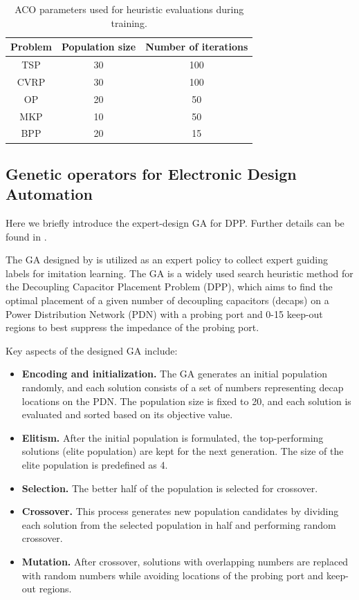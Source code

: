 \begin{table}[]
    \small
    \centering
    \caption{ACO parameters used for heuristic evaluations during training.}
    \begin{tabular}{c|cc}
    \toprule
        Problem &  Population size &  Number of iterations \\
        \midrule
         TSP &   30   &  100   \\
         CVRP &  30    &  100    \\
         OP &    20  &   50  \\
         MKP &   10   &  50   \\
         BPP &    20  &   15  \\
         \bottomrule
    \end{tabular}
    \label{tab: aco parameters}
\end{table}

\subsection{Genetic operators for Electronic Design Automation}

Here we briefly introduce the expert-design GA for DPP. Further details can be found in \cite[Appendix B]{kim2023devformer}.

The GA designed by \citet{kim2023devformer} is utilized as an expert policy to collect expert guiding labels for imitation learning. The GA is a widely used search heuristic method for the Decoupling Capacitor Placement Problem (DPP), which aims to find the optimal placement of a given number of decoupling capacitors (decaps) on a Power Distribution Network (PDN) with a probing port and 0-15 keep-out regions to best suppress the impedance of the probing port.

Key aspects of the designed GA include:
\begin{itemize}
    \item \textbf{Encoding and initialization.} The GA generates an initial population randomly, and each solution consists of a set of numbers representing decap locations on the PDN. The population size is fixed to 20, and each solution is evaluated and sorted based on its objective value.
    \item \textbf{Elitism.} After the initial population is formulated, the top-performing solutions (elite population) are kept for the next generation. The size of the elite population is predefined as 4.
    \item \textbf{Selection. }The better half of the population is selected for crossover.
    \item \textbf{Crossover.} This process generates new population candidates by dividing each solution from the selected population in half and performing random crossover.
    \item \textbf{Mutation.} After crossover, solutions with overlapping numbers are replaced with random numbers while avoiding locations of the probing port and keep-out regions.
\end{itemize}

